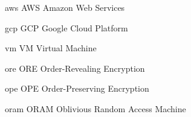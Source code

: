 
\newacronym%
	{aws}
	{AWS}
	{Amazon Web Services}

\newacronym%
	{gcp}
	{GCP}
	{Google Cloud Platform}

\newacronym%
	{vm}
	{VM}
	{Virtual Machine}

\newacronym%
	{ore}
	{ORE}
	{Order-Revealing Encryption}

\newacronym%
	{ope}
	{OPE}
	{Order-Preserving Encryption}

\newacronym%
	{oram}
	{ORAM}
	{Oblivious Random Access Machine}

